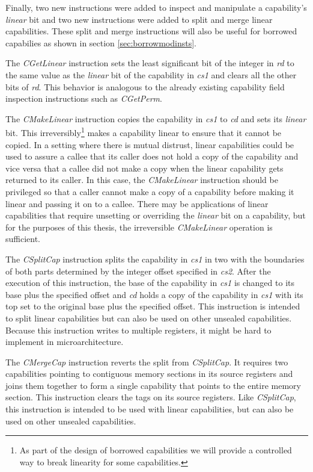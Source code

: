 Finally, two new instructions were added to inspect and manipulate a capability's \textit{linear} bit and two new instructions were added to split and merge linear capabilities. These split and merge instructions will also be useful for borrowed capabilies as shown in section \ref{sec:borrowmodinsts}.

The \textit{CGetLinear} instruction sets the least significant bit of the integer in \textit{rd} to the same value as the \textit{linear} bit of the capability in \textit{cs1} and clears all the other bits of \textit{rd}. This behavior is analogous to the already existing capability field inspection instructions such as \textit{CGetPerm}.

The \textit{CMakeLinear} instruction copies the capability in \textit{cs1} to \textit{cd} and sets its \textit{linear} bit. This irreversibly\footnote{As part of the design of borrowed capabilities we will provide a controlled way to break linearity for some capabilities.} makes a capability linear to ensure that it cannot be copied.
In a setting where there is mutual distrust, linear capabilities could be used to assure a callee that its caller does not hold a copy of the capability and vice versa that a callee did not make a copy when the linear capability gets returned to its caller.
In this case, the \textit{CMakeLinear} instruction should be privileged so that a caller cannot make a copy of a capability before making it linear and passing it on to a callee.
There may be applications of linear capabilities that require unsetting or overriding the \textit{linear} bit on a capability, but for the purposes of this thesis, the irreversible \textit{CMakeLinear} operation is sufficient.

The \textit{CSplitCap} instruction splits the capability in \textit{cs1} in two with the boundaries of both parts determined by the integer offset specified in \textit{cs2}.
After the execution of this instruction, the base of the capability in \textit{cs1} is changed to its base plus the specified offset and \textit{cd} holds a copy of the capability in \textit{cs1} with its top set to the original base plus the specified offset. This instruction is intended to split linear capabilities but can also be used on other unsealed capabilities. Because this instruction writes to multiple registers, it might be hard to implement in microarchitecture.

The \textit{CMergeCap} instruction reverts the split from \textit{CSplitCap}. It requires two capabilities pointing to contiguous memory sections in its source registers and joins them together to form a single capability that points to the entire memory section. This instruction clears the tags on its source registers. Like \textit{CSplitCap}, this instruction is intended to be used with linear capabilities, but can also be used on other unsealed capabilities.

